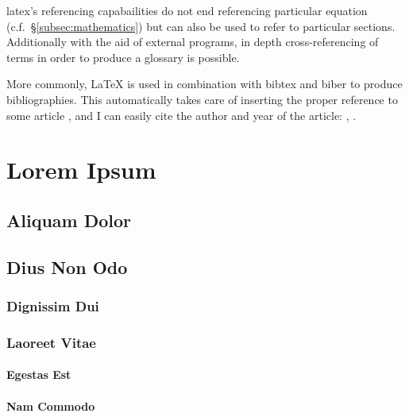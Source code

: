 \documentclass[a4paper,twoside,11pt,final]{article}
\begin{document}
\Gls{latex}'s referencing capabailities do not end referencing particular equation
(c.f.~\S\ref{subsec:mathematics}) but can also be used to refer to particular
sections.  Additionally with the aid of external programs, in depth
cross-referencing of terms in order to produce a \gls{glossary} is possible.

More commonly, LaTeX is used in combination with \gls{bibtex} and \gls{biber} to
produce bibliographies.  This automatically takes care of inserting the proper
reference to some article \cite{Smith2013}, and I can easily cite the author and
year of the article: \citeauthor{Smith2013}, \citeyear{Smith2013}.


\clearpage
\section{Lorem Ipsum}

\lipsum[1-4]

\subsection{Aliquam Dolor}

\lipsum[6-9]

\subsection{Dius Non Odo}

\lipsum[10]

\subsubsection{Dignissim Dui}

\lipsum[11-12]

\subsubsection{Laoreet Vitae}

\lipsum[13-15]

\paragraph{Egestas Est} \lipsum[16]

\paragraph{Nam Commodo} \lipsum[17]


\lipsum[18-22]





\clearpage
\pagestyle{empty}

\printglossaries


\clearpage
\pagestyle{empty}

\printbibliography
\end{document}
